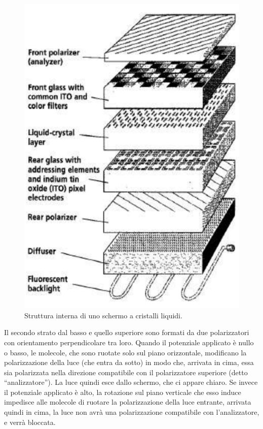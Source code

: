 \documentclass[a4paper,11pt]{article}
\begin{document}
\renewcommand{\thefigure}{4.5}
\begin{figure}[!h]
  \centering
    \includegraphics[scale=0.6]{images/4/lcd_layers.png}
    \caption{Struttura interna di uno schermo a cristalli liquidi.}
\end{figure}

Il secondo strato dal basso e quello superiore sono formati da due polarizzatori
con orientamento perpendicolare tra loro. Quando il potenziale applicato è nullo o basso, le molecole, che sono ruotate
solo sul piano orizzontale, modificano la polarizzazione della luce (che entra da sotto) in modo che, arrivata in cima,
essa sia polarizzata nella direzione compatibile con il polarizzatore superiore (detto ``analizzatore''). La luce quindi esce dallo
schermo, che ci appare chiaro. Se invece il potenziale applicato è alto, la rotazione sul piano verticale che esso induce impedisce
alle molecole di ruotare la polarizzazione della luce entrante, arrivata quindi in cima, la luce non avrà
una polarizzazione compatibile con l'analizzatore, e verrà bloccata.
\end{document}
